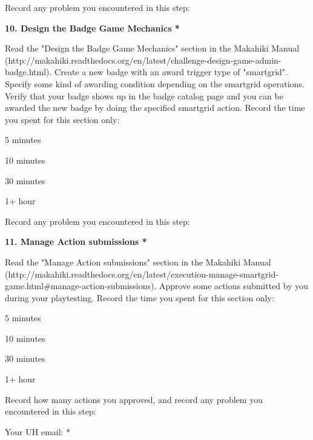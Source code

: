 Record any problem you encountered in this step:

{\bf 10. Design the Badge Game Mechanics *}

Read the "Design the Badge Game Mechanics" section in the Makahiki Manual (http://makahiki.readthedocs.org/en/latest/challenge-design-game-admin-badge.html). Create a new badge with an award trigger type of "smartgrid". Specify some kind of awarding condition depending on the smartgrid operations. Verify that your badge shows up in the badge catalog page and you can be awarded the new badge by doing the specified smartgrid action. Record the time you spent for this section only:

\begin{compactitem}
\item 5 minutes
\item  10 minutes
\item  30 minutes
\item  1+ hour
\end{compactitem}


Record any problem you encountered in this step:

{\bf 11. Manage Action submissions *}

Read the "Manage Action submissions" section in the Makahiki Manual (http://makahiki.readthedocs.org/en/latest/execution-manage-smartgrid-game.html\#manage-action-submissions). Approve some actions submitted by you during your playtesting. Record the time you spent for this section only:

\begin{compactitem}
\item 5 minutes
\item  10 minutes
\item  30 minutes
\item  1+ hour
\end{compactitem}


Record how many actions you approved, and record any problem you encountered in this step:

Your UH email: *
